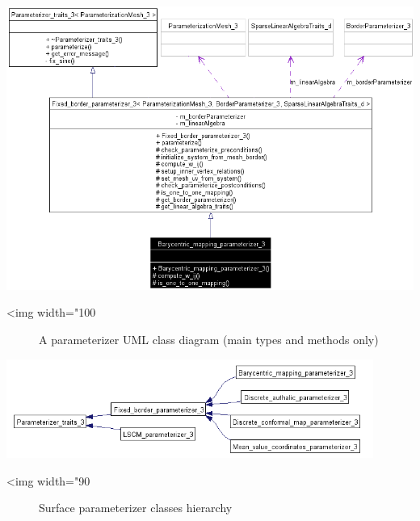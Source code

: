 \begin{center}
    \label{Surface_mesh_parameterization-fig-parameterizer_class_diagram}
    \begin{ccTexOnly}
        \includegraphics[width=1.0\textwidth]{Surface_mesh_parameterization/parameterizer_class_diagram}
    \end{ccTexOnly}
    \begin{ccHtmlOnly}
        <img width="100%
    \end{ccHtmlOnly}
    \begin{figure}[h]
        \caption{A parameterizer UML class diagram (main types and methods only)}
    \end{figure}
\end{center}

\begin{center}
    \label{Surface_mesh_parameterization-fig-parameterizers_class_hierarchy}
    \begin{ccTexOnly}
        \includegraphics[width=0.9\textwidth]{Surface_mesh_parameterization/parameterizers_class_hierarchy}
    \end{ccTexOnly}
    \begin{ccHtmlOnly}
        <img width="90%
    \end{ccHtmlOnly}
    \begin{figure}[h]
        \caption{Surface parameterizer classes hierarchy}
    \end{figure}
\end{center}

